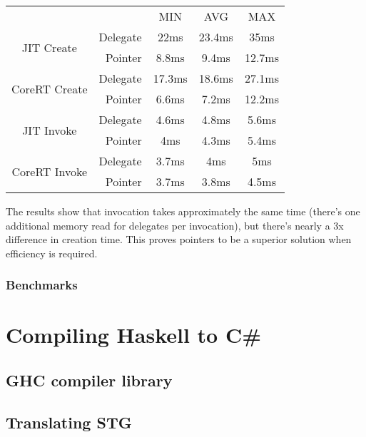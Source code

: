 \documentclass[en]{pracamgr}
\begin{document}
\begin{center}
\begin{tabular}{c r c c c}
    & & MIN & AVG & MAX \\
    \cline{3-5}

    \multirow{2}{*}{JIT Create}
    & Delegate & 22ms & 23.4ms & 35ms \\
    & Pointer & 8.8ms & 9.4ms & 12.7ms \\
    \cline{2-5}
    
    \multirow{2}{*}{CoreRT Create}
    & Delegate & 17.3ms & 18.6ms & 27.1ms \\
    & Pointer & 6.6ms & 7.2ms & 12.2ms \\
    \cline{2-5}
    
    \multirow{2}{*}{JIT Invoke}
    & Delegate & 4.6ms & 4.8ms & 5.6ms \\
    & Pointer & 4ms & 4.3ms & 5.4ms \\
    \cline{2-5}
    
    \multirow{2}{*}{CoreRT Invoke}
    & Delegate & 3.7ms & 4ms & 5ms \\
    & Pointer & 3.7ms & 3.8ms & 4.5ms \\
\end{tabular}
\end{center}

The results show that invocation takes approximately the same time
(there's one additional memory read for delegates per invocation),
but there's nearly a 3x difference in creation time.
This proves pointers to be a superior solution
when efficiency is required.

\subsection{Benchmarks}


\chapter{Compiling Haskell to C\#}\label{r:compiler}

\section{GHC compiler library}

\section{Translating STG}
\end{document}
